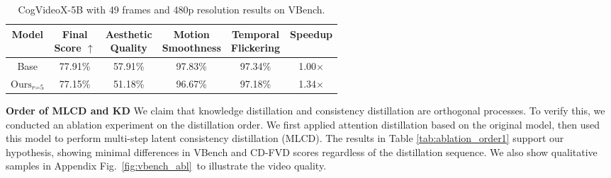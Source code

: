 
\begin{table}[ht]
\scriptsize \centering
\setlength{\tabcolsep}{4pt}
\caption{CogVideoX-5B with 49 frames and 480p resolution results on VBench.}
\begin{tabular}{cccccc}
\toprule 
\textbf{Model} & \makecell{\textbf{Final} \\ \textbf{Score}} $\uparrow$ & \makecell{\textbf{Aesthetic} \\ \textbf{Quality}} & \makecell{\textbf{Motion} \\ \textbf{Smoothness}} & \makecell{\textbf{Temporal} \\ \textbf{Flickering}} & \textbf{Speedup} \\
\midrule
Base & 77.91\% & 57.91\% & 97.83\% & 97.34\% & 1.00$\times$ \\
$\text{Ours}_{r\text{=5}}$ & 77.15\% & 51.18\% & 96.67\% & 97.18\% & 1.34$\times$ \\
\bottomrule
\end{tabular}
\label{tab:cog_vbench1}
\end{table}

\textbf{Order of MLCD and KD} We claim that knowledge distillation and consistency distillation are orthogonal processes. To verify this, we conducted an ablation experiment on the distillation order. We first applied attention distillation based on the original model, then used this model to perform multi-step latent consistency distillation (MLCD). The results in Table \ref{tab:ablation_order1} support our hypothesis, showing minimal differences in VBench and CD-FVD scores regardless of the distillation sequence. We also show qualitative samples in Appendix Fig.~\ref{fig:vbench_abl}~to illustrate the video quality.

